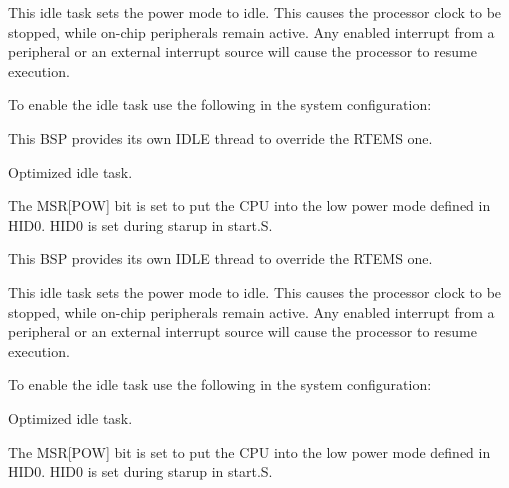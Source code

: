 This idle task sets the power mode to idle. This causes the processor clock to be stopped, while on-\/chip peripherals remain active. Any enabled interrupt from a peripheral or an external interrupt source will cause the processor to resume execution.

To enable the idle task use the following in the system configuration\+:


\begin{DoxyCode}{0}
\DoxyCodeLine{\textcolor{preprocessor}{\#include <bsp.h>}}
\DoxyCodeLine{}
\DoxyCodeLine{\textcolor{preprocessor}{\#define CONFIGURE\_INIT}}
\DoxyCodeLine{}
\DoxyCodeLine{\textcolor{preprocessor}{\#define CONFIGURE\_IDLE\_TASK\_BODY bsp\_idle\_thread}}
\DoxyCodeLine{}
\end{DoxyCode}


This B\+SP provides its own I\+D\+LE thread to override the R\+T\+E\+MS one.

Optimized idle task.

The M\+SR\mbox{[}P\+OW\mbox{]} bit is set to put the C\+PU into the low power mode defined in H\+I\+D0. H\+I\+D0 is set during starup in start.\+S.

This B\+SP provides its own I\+D\+LE thread to override the R\+T\+E\+MS one.

This idle task sets the power mode to idle. This causes the processor clock to be stopped, while on-\/chip peripherals remain active. Any enabled interrupt from a peripheral or an external interrupt source will cause the processor to resume execution.

To enable the idle task use the following in the system configuration\+:


\begin{DoxyCode}{0}
\DoxyCodeLine{\textcolor{preprocessor}{\#include <bsp.h>}}
\DoxyCodeLine{}
\DoxyCodeLine{\textcolor{preprocessor}{\#define CONFIGURE\_INIT}}
\DoxyCodeLine{}
\DoxyCodeLine{\textcolor{preprocessor}{\#define CONFIGURE\_IDLE\_TASK\_BODY bsp\_idle\_thread}}
\DoxyCodeLine{}
\end{DoxyCode}


Optimized idle task.

The M\+SR\mbox{[}P\+OW\mbox{]} bit is set to put the C\+PU into the low power mode defined in H\+I\+D0. H\+I\+D0 is set during starup in start.\+S. 